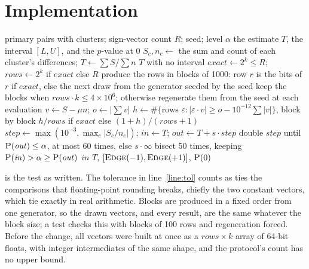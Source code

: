 \documentclass[11pt]{article}
\theoremstyle{plain}
\theoremstyle{definition}
\theoremstyle{remark}
\newcommand{\sgn}{\varepsilon}
\begin{document}
\section{Implementation}\label{sec:impl}

\begin{algorithm}[t]
\caption{The cluster sign-flip test and its inverted interval.}\label{alg:flip}
\begin{algorithmic}[1]
\Require primary pairs with clusters; sign-vector count $R$; seed; level $\alpha$
\Ensure the estimate $T$, the interval $[L, U]$, and the $p$-value at 0
\State $S_c, n_c \gets$ the sum and count of each cluster's differences; $T \gets \sum S / \sum n$
 \Return $T$ with no interval \EndIf
\State $\mathit{exact} \gets 2^k \le R$; \quad $\mathit{rows} \gets 2^k$ if $\mathit{exact}$ else $R$
\State produce the rows in blocks of 1000: row $r$ is the bits of $r$ if $\mathit{exact}$, else
  the next draw from the generator seeded by the seed
\State keep the blocks when $\mathit{rows} \cdot k \le 4 \times 10^6$; otherwise regenerate them
  from the seed at each evaluation
  \State $v \gets S - \mu n$; \quad $o \gets |\sum v|$
  \State $h \gets \#\{\text{rows } \sgn : |\sgn \cdot v| \ge o - 10^{-12} \sum |v|\}$, block by block
    \label{line:tol}
  \State \Return $h / \mathit{rows}$ if $\mathit{exact}$ else $(1 + h)/(\mathit{rows} + 1)$
\EndFunction
{} 
  \State $\mathit{step} \gets \max(10^{-3}, \max_c |S_c / n_c|)$; \quad $\mathit{in} \gets T$;
    \quad $\mathit{out} \gets T + s \cdot \mathit{step}$
  \State double $\mathit{step}$ until $\Call{P}{\mathit{out}} \le \alpha$, at most 60 times,
    else \Return $s \cdot \infty$
  \State bisect 50 times, keeping $\Call{P}{\mathit{in}} > \alpha \ge \Call{P}{\mathit{out}}$
  \State \Return $\mathit{in}$
\EndFunction
\State \Return $T$, $[\Call{Edge}{-1}, \Call{Edge}{+1}]$, $\Call{P}{0}$
\end{algorithmic}
\end{algorithm}

 is the test as written. The tolerance in line~\ref{line:tol} counts as ties the comparisons that
floating-point rounding breaks, chiefly the two constant vectors, which tie exactly in real
arithmetic. Blocks are produced in a fixed order from one generator, so the drawn vectors, and
every result, are the same whatever the block size; a test checks this with blocks of 100 rows and
regeneration forced. Before the change, all vectors were built at once as a $\mathit{rows} \times
k$ array of 64-bit floats, with integer intermediates of the same shape, and the protocol's count
has no upper bound.
\end{document}

